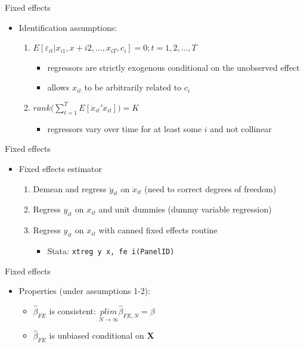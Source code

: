 \documentclass{beamer}
\begin{document}
\begin{frame}{Fixed effects}
	
	\begin{itemize}
	\item Identification assumptions:	
		\begin{enumerate}
		\item $E[\varepsilon_{it} | x_{i1}, x+{i2}, \dots, x_{iT}, c_i]=0; t=1,2,\dots,T$
			\begin{itemize}
			\item regressors are strictly exogenous conditional on the unobserved effect
			\item allows $x_{it}$ to be arbitrarily related to $c_i$
			\end{itemize}
		\item $rank\bigg( \sum_{t=1}^T E[\ddot{x}_{it}'\ddot{x}_{it}]\bigg) = K$
			\begin{itemize}
			\item regressors vary over time for at least some $i$ and not collinear
			\end{itemize}
		\end{enumerate}
	\end{itemize}
\end{frame}

\begin{frame}{Fixed effects}
	
	\begin{itemize}
	\item Fixed effects estimator
		\begin{enumerate}
		\item Demean and regress $\ddot{y}_{it}$ on $\ddot{x}_{it}$ (need to correct degrees of freedom)
		\item Regress $y_{it}$ on $x_{it}$ and unit dummies (dummy variable regression)
		\item Regress $y_{it}$ on $x_{it}$ with canned fixed effects routine
			\begin{itemize}
			\item Stata: \texttt{xtreg y x, fe i(PanelID)}
			\end{itemize}
		\end{enumerate}
	\end{itemize}
\end{frame}


\begin{frame}{Fixed effects}

\begin{itemize}
	\item Properties (under assumptions 1-2):
		\begin{itemize}
		\item $\widehat{\beta}_{FE}$ is consistent: $\underset{N\rightarrow \infty}{plim} \widehat{\beta}_{FE,N}=\beta$
		\item $\widehat{\beta}_{FE}$ is unbiased conditional on \textbf{X}
		\end{itemize}
\end{itemize}

\end{frame}
\end{document}
